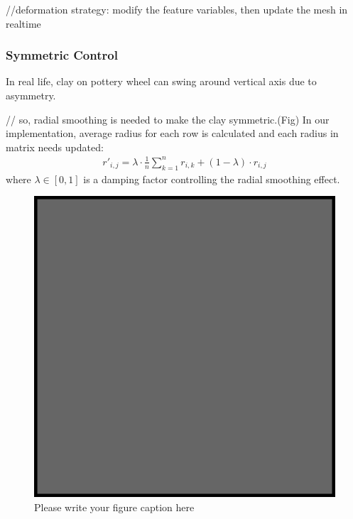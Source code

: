 //deformation strategy: modify the feature variables, then update the mesh in realtime

\subsubsection{Symmetric Control}
\label{sec:4.2.1}
In real life, clay on pottery wheel can swing around vertical axis due to asymmetry. 

// so, radial smoothing is needed to make the clay symmetric.(Fig)
In our implementation, average radius for each row is calculated and each radius in matrix  needs updated:
\begin{equation}
\begin{split}
r'_{i,j} = 
\lambda \cdot \frac{1}{n}\sum_{k=1}^{n} r_{i,k}
+ (1 - \lambda) \cdot r_{i,j}
\end{split}
\end{equation}
where $\lambda \in [0,1]$ is a damping factor controlling the radial smoothing effect.

\begin{figure}
  \includegraphics{example.eps}
\caption{Please write your figure caption here}
\label{fig:1}       %
\end{figure}

